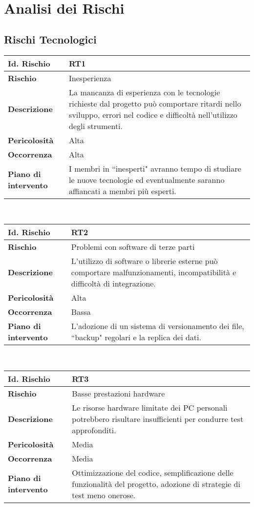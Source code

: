 \section{Analisi dei Rischi}

\subsection{Rischi Tecnologici}

\begin{tabular}{|L{4cm}|L{9.7cm}|}
    \hline
    \textbf{Id. Rischio} & \textbf{RT1} \\
    \hline
    \textbf{Rischio} & Inesperienza \\
    \hline
    \textbf{Descrizione} & La mancanza di esperienza con le tecnologie richieste dal progetto può comportare ritardi nello sviluppo, errori nel codice e difficoltà nell'utilizzo degli strumenti. \\
    \hline
    \textbf{Pericolosità} & Alta \\
    \hline
    \textbf{Occorrenza} & Alta \\
    \hline
    \textbf{Piano di intervento} & I membri in ``inesperti" avranno tempo di studiare le nuove tecnologie ed eventualmente saranno affiancati a membri più esperti. \\
    \hline
\end{tabular}
\\[30pt]
\begin{tabular}{|L{4cm}|L{9.7cm}|}
    \hline
    \textbf{Id. Rischio} & \textbf{RT2} \\
    \hline
    \textbf{Rischio} & Problemi con software di terze parti \\
    \hline
    \textbf{Descrizione} & L'utilizzo di software o librerie esterne può comportare malfunzionamenti, incompatibilità e difficoltà di integrazione. \\
    \hline
    \textbf{Pericolosità} & Alta \\
    \hline
    \textbf{Occorrenza} & Bassa \\
    \hline
    \textbf{Piano di intervento} & L'adozione di un sistema di versionamento dei file, ``backup" regolari e la replica dei dati. \\
    \hline
\end{tabular}
\\[30pt]
\begin{tabular}{|L{4cm}|L{9.7cm}|}
    \hline
    \textbf{Id. Rischio} & \textbf{RT3} \\
    \hline
    \textbf{Rischio} & Basse prestazioni hardware \\
    \hline
    \textbf{Descrizione} & Le risorse hardware limitate dei PC personali potrebbero risultare insufficienti per condurre test approfonditi. \\
    \hline
    \textbf{Pericolosità} & Media \\
    \hline
    \textbf{Occorrenza} & Media \\
    \hline
    \textbf{Piano di intervento} & Ottimizzazione del codice, semplificazione delle funzionalità del progetto, adozione di strategie di test meno onerose. \\
    \hline
\end{tabular}

